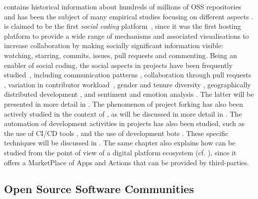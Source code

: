 \github contains historical information about hundreds of millions of OSS repositories and has been the subject of many empirical studies focusing on different aspects \cite{Kalliamvakou2014}.
\github is claimed to be the first \emph{social coding} platform~\cite{Dabbish2012}, since it was the first hosting platform to provide a wide range of mechanisms and associated visualisations to increase collaboration by making socially significant information visible: watching, starring, commits, issues, pull requests and commenting.
Being an enabler of social coding, the social aspects in \github projects have been frequently studied~\cite{Tsay2014, padhye2014extcontrib}, including
communication patterns \cite{1-042},
collaboration through pull requests  \cite{Rahman:MSR:2014, Yu:MSR:2015, Gousios2016},
variation in contributor workload~\cite{Vasilescu2014},
gender and tenure diversity \cite{vasilescu2015gender,vasilescu2015quality},
geographically distributed development \cite{takhteyev2010ossgeography, rastogi2018geobias, wachs2021ossgeography},
and sentiment and emotion analysis \cite{1-011, 1-063, 1-067, 1-055, 1-076, Guzman:2014:SAC:2597073.2597118}. The latter will be presented in more detail in .
%
The phenomenon of project forking has also been actively studied in the context of \github  \cite{biazzini2014maythefork, Jiang:emse:2017, Zhou:ICSE:2020}, as will be discussed in more detail in .
%
The automation of development activities in \github projects has also been studied, such as the use of CI/CD tools \cite{vasilescu2015quality, beller2017oops, Golzadeh2021SANER}, and the use of development bots \cite{Bodegha2021,Wang2022-butler, AbdellatifBotHunter2022, wessel2022emse}. These specific techniques  will be discussed in . The same chapter also explains how \github can be studied from the point of view of a digital platform ecosystem (cf. ), since it offers a MarketPlace of Apps and Actions that can be provided by third-parties.


\subsection{Open Source Software Communities}

